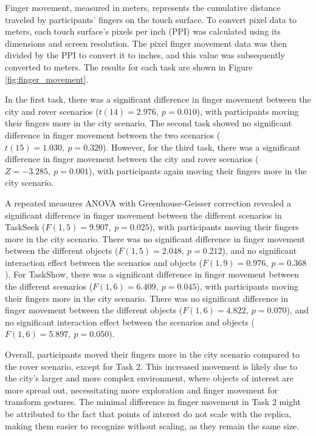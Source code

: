             Finger movement, measured in meters, represents the cumulative distance traveled by participants' fingers on the touch surface. To convert pixel data to meters, each touch surface's pixels per inch (PPI) was calculated using its dimensions and screen resolution. The pixel finger movement data was then divided by the PPI to convert it to inches, and this value was subsequently converted to meters. The results for each task are shown in Figure \ref{fig:finger_movement}. 

            In the first task, there was a significant difference in finger movement between the city and rover scenarios ($t(14) = 2.976,\ p = 0.010$), with participants moving their fingers more in the city scenario. The second task showed no significant difference in finger movement between the two scenarios ($t(15) = 1.030,\ p = 0.320$). However, for the third task, there was a significant difference in finger movement between the city and rover scenarios ($Z = -3.285,\ p = 0.001$), with participants again moving their fingers more in the city scenario.

            A repeated measures ANOVA with Greenhouse-Geisser correction revealed a significant difference in finger movement between the different scenarios in TaskSeek ($F(1, 5) = 9.907,\ p = 0.025$), with participants moving their fingers more in the city scenario. There was no significant difference in finger movement between the different objects ($F(1, 5) = 2.048,\ p = 0.212$), and no significant interaction effect between the scenarios and objects ($F(1, 9) = 0.976,\ p = 0.368$). For TaskShow, there was a significant difference in finger movement between the different scenarios ($F(1, 6) = 6.409,\ p = 0.045$), with participants moving their fingers more in the city scenario. There was no significant difference in finger movement between the different objects ($F(1, 6) = 4.822,\ p = 0.070$), and no significant interaction effect between the scenarios and objects ($F(1, 6) = 5.897,\ p = 0.050$).

            Overall, participants moved their fingers more in the city scenario compared to the rover scenario, except for Task 2. This increased movement is likely due to the city's larger and more complex environment, where objects of interest are more spread out, necessitating more exploration and finger movement for transform gestures. The minimal difference in finger movement in Task 2 might be attributed to the fact that points of interest do not scale with the replica, making them easier to recognize without scaling, as they remain the same size.

